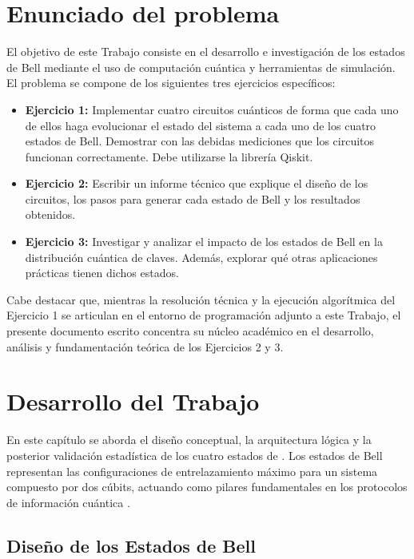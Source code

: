 \documentclass[11pt,a4paper,spanish]{book}
\begin{document}
\chapter{Enunciado del problema}

El objetivo de este Trabajo consiste en el desarrollo e investigación de los estados de Bell mediante el uso de computación cuántica y herramientas de simulación. El problema se compone de los siguientes tres ejercicios específicos:

\begin{itemize}
    \item \textbf{Ejercicio 1:} Implementar cuatro circuitos cuánticos de forma que cada uno de ellos haga evolucionar el estado del sistema a cada uno de los cuatro estados de Bell. Demostrar con las debidas mediciones que los circuitos funcionan correctamente. Debe utilizarse la librería Qiskit.
    
    \item \textbf{Ejercicio 2:} Escribir un informe técnico que explique el diseño de los circuitos, los pasos para generar cada estado de Bell y los resultados obtenidos.
    
    \item \textbf{Ejercicio 3:} Investigar y analizar el impacto de los estados de Bell en la distribución cuántica de claves. Además, explorar qué otras aplicaciones prácticas tienen dichos estados.
\end{itemize}

\vspace{0.5cm}
Cabe destacar que, mientras la resolución técnica y la ejecución algorítmica del Ejercicio 1 se articulan en el entorno de programación adjunto a este Trabajo, el presente documento escrito concentra su núcleo académico en el desarrollo, análisis y fundamentación teórica de los Ejercicios 2 y 3.

\chapter{Desarrollo del Trabajo}

En este capítulo se aborda el diseño conceptual, la arquitectura lógica y la posterior validación estadística de los cuatro estados de \cite{bell1964}. Los estados de Bell representan las configuraciones de entrelazamiento máximo \citep{schrodinger1935} para un sistema compuesto por dos cúbits, actuando como pilares fundamentales en los protocolos de información cuántica \citep{nielsen2010}.
 \citep{schrodinger1935}
\section{Diseño de los Estados de Bell}
\end{document}
